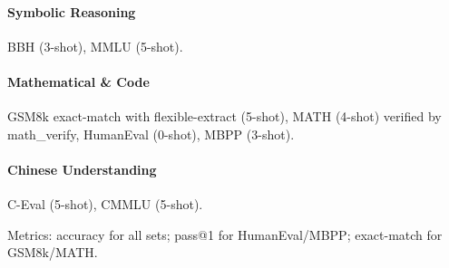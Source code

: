 \paragraph{Symbolic Reasoning} BBH \citep{Suzgun2022ChallengingBT} (3-shot), MMLU \citep{hendryckstest2021} (5-shot).

\paragraph{Mathematical \& Code} GSM8k \citep{cobbe2021gsm8k} exact-match with flexible-extract (5-shot), MATH \citep{hendrycks2021math} (4-shot) verified by math\_verify, HumanEval \citep{chen2021humaneval}(0-shot), MBPP \citep{austin2021mbpp}(3-shot).

\paragraph{Chinese Understanding} C-Eval \citep{huang2023ceval} (5-shot), CMMLU \citep{li2024cmmlu} (5-shot).

Metrics: accuracy for all sets; pass@1 for HumanEval/MBPP; exact-match for GSM8k/MATH.

